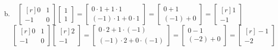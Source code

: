 \documentclass[../main.tex]{subfiles}
\begin{document}
\begin{enumerate}[a)]
\[		\]
	\setcounter{enumi}{3}
	\item 
		\[
			\begin{bmatrix*}[r]0&1\\-1&0\end{bmatrix*}
			\begin{bmatrix}1\\1\end{bmatrix}
			=
			\begin{bmatrix}
				0\cdot1 + 1\cdot1 \\
				(-1)\cdot1 + 0\cdot1
			\end{bmatrix}
			=
			\begin{bmatrix}
				0 + 1 \\
				(-1) + 0
			\end{bmatrix}
			=
			\begin{bmatrix*}[r]
				1 \\
				-1
			\end{bmatrix*}
		\]
		\[
			\begin{bmatrix*}[r]0&1\\-1&0\end{bmatrix*}
			\begin{bmatrix*}[r]2\\-1\end{bmatrix*}
			=
			\begin{bmatrix}
				0\cdot2 + 1\cdot(-1) \\
				(-1)\cdot2 + 0\cdot(-1)
			\end{bmatrix}
			=
			\begin{bmatrix}
				0 - 1 \\
				(-2) + 0
			\end{bmatrix}
			=
			\begin{bmatrix*}[r]
				-1 \\
				-2
			\end{bmatrix*}
		\]
\end{enumerate}
\end{document}
